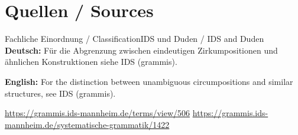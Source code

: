 \documentclass[a4paper,11pt]{article}
\newcommand{\GermanText}[1]{\textbf{Deutsch: }#1\par}
\newcommand{\EnglishText}[1]{{\small\color{SoftGray}\textbf{English: }#1\par}}
\begin{document}
\section{Quellen / Sources}
\begin{grammarentry}{Fachliche Einordnung / Classification}{IDS und Duden / IDS and Duden}
\GermanText{Für die Abgrenzung zwischen eindeutigen Zirkumpositionen und ähnlichen Konstruktionen siehe IDS (grammis).}
\EnglishText{For the distinction between unambiguous circumpositions and similar structures, see IDS (grammis).}
\url{https://grammis.ids-mannheim.de/terms/view/506}
\url{https://grammis.ids-mannheim.de/systematische-grammatik/1422}
\end{grammarentry}
\end{document}

